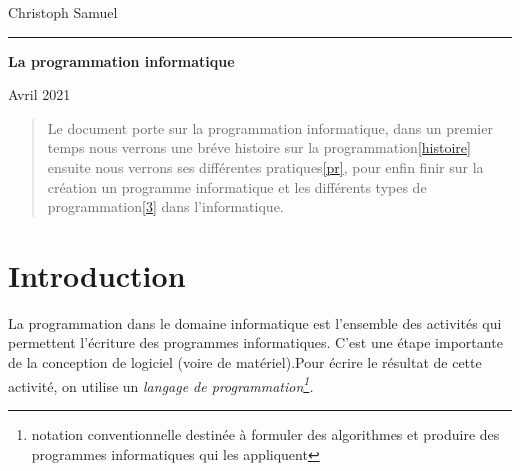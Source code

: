 \documentclass[12pt,a4paper]{article}
\begin{document}
    \begin{titlepage}
        \selectfont
        \begin{flushright}\LARGE
            Christoph Samuel
        \end{flushright}
        \hrule
        \begin{flushleft}\huge\bfseries
            La programmation informatique
        \end{flushleft}
        \begin{center}
            Avril 2021
        \end{center}
    \end{titlepage}
    
    \addto\captionsfrench{\renewcommand{\abstractname}{La programmation informatique}}
    \setcounter{tocdepth}{3}
    
    
    \clearpage
    
    \tableofcontents
    \listoffigures
    \listoftables
    \vspace{2,5cm}
    
    \begin{abstract}
        Le document porte sur la programmation informatique, dans un premier temps nous verrons une bréve histoire sur la programmation\ref{histoire} ensuite nous verrons ses différentes pratiques\ref{pr}, pour enfin finir sur la création un programme informatique et les différents types de programmation\ref{3} dans l'informatique.
    \end{abstract}
    
    
    \newpage
    
    
    \section{Introduction}
    La programmation dans le domaine informatique est l'ensemble des activités qui permettent l'écriture des programmes informatiques. C'est une étape importante de la conception de logiciel (voire de matériel).Pour écrire le résultat de cette activité, on utilise un \textit{langage de programmation\footnote{notation conventionnelle destinée à formuler des algorithmes et produire des programmes informatiques qui les appliquent}.}\\
    
\end{document}
